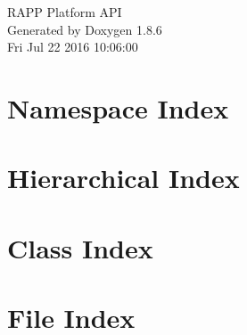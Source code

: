 \documentclass[twoside]{book}
\newcommand{\clearemptydoublepage}{%
  \newpage{\pagestyle{empty}\cleardoublepage}%
}
\begin{document}
\hypersetup{pageanchor=false}
\begin{titlepage}
\vspace*{7cm}
\begin{center}%
{\Large R\-A\-P\-P Platform A\-P\-I }\\
\vspace*{1cm}
{\large Generated by Doxygen 1.8.6}\\
\vspace*{0.5cm}
{\small Fri Jul 22 2016 10:06:00}\\
\end{center}
\end{titlepage}
\clearemptydoublepage
\tableofcontents
\clearemptydoublepage
{}
\hypersetup{pageanchor=true}

\chapter{Namespace Index}

\chapter{Hierarchical Index}

\chapter{Class Index}

\chapter{File Index}

\end{document}
